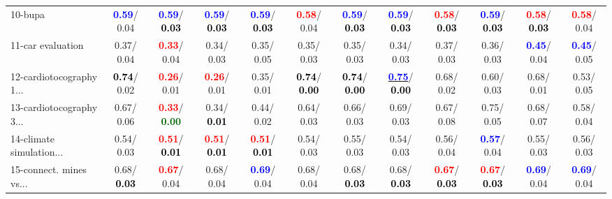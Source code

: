 \begin{table}[h]
\begin{center}
{\begin{tabular}{lc|c|c|c|c|c|c|c|c|c|c}
10-bupa & \textcolor{blue}{\textbf{  0.59}}/  0.04 & \textcolor{blue}{\textbf{  0.59}}/\textcolor{black}{\textbf{  0.03}} & \textcolor{blue}{\textbf{  0.59}}/\textcolor{black}{\textbf{  0.03}} & \textcolor{blue}{\textbf{  0.59}}/\textcolor{black}{\textbf{  0.03}} & \textcolor{red}{\textbf{  0.58}}/  0.04 & \textcolor{blue}{\textbf{  0.59}}/\textcolor{black}{\textbf{  0.03}} & \textcolor{blue}{\textbf{  0.59}}/\textcolor{black}{\textbf{  0.03}} & \textcolor{red}{\textbf{  0.58}}/\textcolor{black}{\textbf{  0.03}} & \textcolor{blue}{\textbf{  0.59}}/\textcolor{black}{\textbf{  0.03}} & \textcolor{red}{\textbf{  0.58}}/\textcolor{black}{\textbf{  0.03}} & \textcolor{red}{\textbf{  0.58}}/  0.04 \\
11-car evaluation &   0.37/  0.04 & \textcolor{red}{\textbf{  0.33}}/  0.04 &   0.34/  0.03 &   0.35/  0.05 &   0.35/  0.03 &   0.35/  0.03 &   0.34/  0.03 &   0.37/  0.03 &   0.36/  0.03 & \textcolor{blue}{\textbf{  0.45}}/  0.04 & \textcolor{blue}{\textbf{  0.45}}/  0.05 \\
12-cardiotocography 1... & \textcolor{black}{\textbf{  0.74}}/  0.02 & \textcolor{red}{\textbf{  0.26}}/  0.01 & \textcolor{red}{\textbf{  0.26}}/  0.01 &   0.35/  0.01 & \textcolor{black}{\textbf{  0.74}}/\textcolor{black}{\textbf{  0.00}} & \textcolor{black}{\textbf{  0.74}}/\textcolor{black}{\textbf{  0.00}} & \underline{\textcolor{blue}{\textbf{  0.75}}}/\textcolor{black}{\textbf{  0.00}} &   0.68/  0.02 &   0.60/  0.03 &   0.68/  0.01 &   0.53/  0.05 \\
13-cardiotocography 3... &   0.67/  0.06 & \textcolor{red}{\textbf{  0.33}}/\textcolor{darkgreen}{\textbf{  0.00}} &   0.34/\textcolor{black}{\textbf{  0.01}} &   0.44/  0.02 &   0.64/  0.03 &   0.66/  0.03 &   0.69/  0.03 &   0.67/  0.08 &   0.75/  0.05 &   0.68/  0.07 &   0.58/  0.04 \\
14-climate simulation... &   0.54/  0.03 & \textcolor{red}{\textbf{  0.51}}/\textcolor{black}{\textbf{  0.01}} & \textcolor{red}{\textbf{  0.51}}/\textcolor{black}{\textbf{  0.01}} & \textcolor{red}{\textbf{  0.51}}/\textcolor{black}{\textbf{  0.01}} &   0.54/  0.03 &   0.55/  0.03 &   0.54/  0.03 &   0.56/  0.04 & \textcolor{blue}{\textbf{  0.57}}/  0.04 &   0.55/  0.03 &   0.56/  0.03 \\ \hline
15-connect. mines vs... &   0.68/\textcolor{black}{\textbf{  0.03}} & \textcolor{red}{\textbf{  0.67}}/  0.04 &   0.68/  0.04 & \textcolor{blue}{\textbf{  0.69}}/  0.04 &   0.68/  0.04 &   0.68/\textcolor{black}{\textbf{  0.03}} &   0.68/\textcolor{black}{\textbf{  0.03}} & \textcolor{red}{\textbf{  0.67}}/\textcolor{black}{\textbf{  0.03}} & \textcolor{red}{\textbf{  0.67}}/\textcolor{black}{\textbf{  0.03}} & \textcolor{blue}{\textbf{  0.69}}/  0.04 & \textcolor{blue}{\textbf{  0.69}}/  0.04 \\

\end{tabular}}
\end{center}
\end{table}
